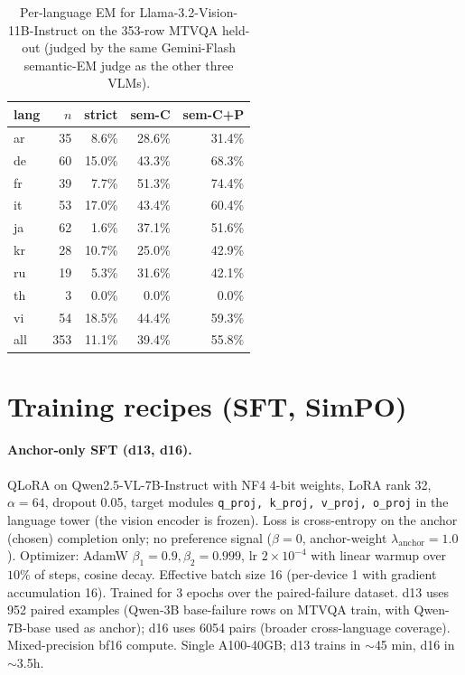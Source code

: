 \begin{table}[t]
\centering
\small
\begin{tabular}{lrrrr}
\toprule
lang & $n$ & strict & sem-C & sem-C+P \\
\midrule
ar & 35 & 8.6\%  & 28.6\% & 31.4\% \\
de & 60 & 15.0\% & 43.3\% & 68.3\% \\
fr & 39 & 7.7\%  & 51.3\% & 74.4\% \\
it & 53 & 17.0\% & 43.4\% & 60.4\% \\
ja & 62 & 1.6\%  & 37.1\% & 51.6\% \\
kr & 28 & 10.7\% & 25.0\% & 42.9\% \\
ru & 19 & 5.3\%  & 31.6\% & 42.1\% \\
th & 3  & 0.0\%  & 0.0\%  & 0.0\%  \\
vi & 54 & 18.5\% & 44.4\% & 59.3\% \\
\midrule
all & 353 & 11.1\% & 39.4\% & 55.8\% \\
\bottomrule
\end{tabular}
\caption{Per-language EM for Llama-3.2-Vision-11B-Instruct on the 353-row MTVQA held-out (judged by the same Gemini-Flash semantic-EM judge as the other three VLMs).}
\label{tab:llama-perlang}
\end{table}

\section{Training recipes (SFT, SimPO)}
\label{app:training}

\paragraph{Anchor-only SFT (d13, d16).}
QLoRA \citep{dettmers2023qlora} on Qwen2.5-VL-7B-Instruct with NF4 4-bit weights, LoRA rank 32, $\alpha = 64$, dropout 0.05, target modules \texttt{q\_proj, k\_proj, v\_proj, o\_proj} in the language tower (the vision encoder is frozen). Loss is cross-entropy on the anchor (chosen) completion only; no preference signal ($\beta = 0$, anchor-weight $\lambda_{\text{anchor}} = 1.0$). Optimizer: AdamW $\beta_1=0.9, \beta_2=0.999$, lr $2 \times 10^{-4}$ with linear warmup over $10\%$ of steps, cosine decay. Effective batch size 16 (per-device 1 with gradient accumulation 16). Trained for 3 epochs over the paired-failure dataset. d13 uses 952 paired examples (Qwen-3B base-failure rows on MTVQA train, with Qwen-7B-base used as anchor); d16 uses 6054 pairs (broader cross-language coverage). Mixed-precision bf16 compute. Single A100-40GB; d13 trains in $\sim$45 min, d16 in $\sim$3.5h.


